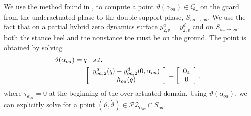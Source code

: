  We use the method found in \cite{ACP:HSCC12}, to compute a point $\vartheta(\alpha_{oa}) \in Q_{r}$ on the guard from the underactuated phase to the double support phase, $S_{ua \to oa}$. We use the fact that on a partial hybrid zero dynamics surface $y^{a}_{2,v} = y^{d}_{2,v}$ and on $S_{ua \to oa}$, both the stance heel and the nonstance toe must be on the ground. The point is obtained by solving
\begin{eqnarray}
\label{eq:inverse}
\vartheta(\alpha_{oa}) = q \hspace{3mm} s.t. \hspace{5cm} \nonumber\\
\left[ \begin{array}{c}
y^{a}_{oa,2}(q) - y^{d}_{oa,2} (0,\alpha_{oa}) \\
h_{oa}(q)
\end{array}
\right] =
\left[ \begin{array}{c}
\zm_4 \\
0
\end{array}
\right],
\end{eqnarray}
where $\tau_{\alpha_{oa}} = 0$ at the beginning of the over actuated domain. Using $\vartheta(\alpha_{oa})$, we can explicitly solve for a point $(\vartheta, \dot{\vartheta}) \in \mathcal{PZ}_{\alpha_{oa}} \cap S_{oa}$.

